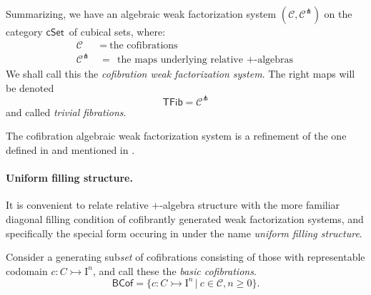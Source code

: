 \documentclass[12pt]{article}
\newcommand{\cSet}{\ensuremath{\mathsf{cSet}}}
\newcommand{\mono}{\ensuremath{\rightarrowtail}}
\newcommand{\I}{\ensuremath{\mathrm{I}}}
\theoremstyle{remark}
\theoremstyle{definition}
\begin{document}
Summarizing, we have an algebraic weak factorization system $(\mathcal{C}, \mathcal{C}^\pitchfork)$ on the category \cSet\ of cubical sets, where:
\begin{align*}
\mathcal{C}\ &=\ \text{the cofibrations}\\
\mathcal{C}^\pitchfork\ &=\  \text{the maps underlying relative $+$-algebras}
\end{align*}
We shall call this the \emph{cofibration weak factorization system}. The right maps will be denoted
\[
\mathsf{TFib} = \mathcal{C}^\pitchfork
\]
and called \emph{trivial fibrations}.

The cofibration algebraic weak factorization system is a refinement of the one defined in \cite{BurkeGarner} and mentioned in \cite{GambinoSattler}.

\paragraph{Uniform filling structure.}

It is convenient to relate relative $+$-algebra structure with the more familiar diagonal filling condition of cofibrantly generated weak factorization systems, and specifically the special form occuring in \cite{CCHM} under the name \emph{uniform filling structure}. 

Consider a generating sub\emph{set} of cofibrations consisting of those with representable codomain $c : C \mono \I^n$, and call these the \emph{basic cofibrations}.
\begin{equation}\label{eq:basiccof}
\mathsf{BCof} = \{c : C\mono \I^n\,|\ c\in \mathcal{C}, n\geq 0 \}.
\end{equation}
\end{document}
